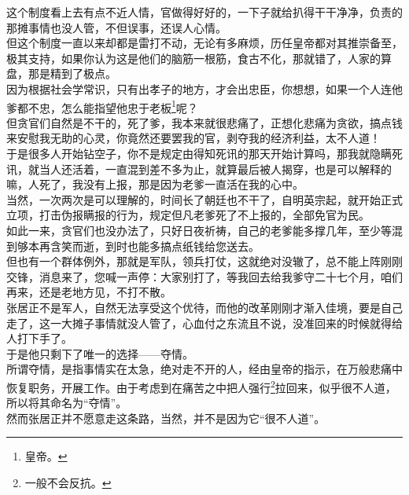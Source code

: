 \begin{multicols}{\theparacolNo}
这个制度看上去有点不近人情，官做得好好的，一下子就给扒得干干净净，负责的那摊事情也没人管，不但误事，还误人心情。\\

但这个制度一直以来却都是雷打不动，无论有多麻烦，历任皇帝都对其推崇备至，极其支持，如果你认为这是他们的脑筋一根筋，食古不化，那就错了，人家的算盘，那是精到了极点。\\

因为根据社会学常识，只有出孝子的地方，才会出忠臣，你想想，如果一个人连他爹都不忠，怎么能指望他忠于老板\footnote{皇帝。}呢？\\

但贪官们自然是不干的，死了爹，我本来就很悲痛了，正想化悲痛为贪欲，搞点钱来安慰我无助的心灵，你竟然还要罢我的官，剥夺我的经济利益，太不人道！\\

于是很多人开始钻空子，你不是规定由得知死讯的那天开始计算吗，那我就隐瞒死讯，就当人还活着，一直混到差不多为止，就算最后被人揭穿，也是可以解释的嘛，人死了，我没有上报，那是因为老爹一直活在我的心中。\\

当然，一次两次是可以理解的，时间长了朝廷也不干了，自明英宗起，就开始正式立项，打击伪报瞒报的行为，规定但凡老爹死了不上报的，全部免官为民。\\

如此一来，贪官们也没办法了，只好日夜祈祷，自己的老爹能多撑几年，至少等混到够本再含笑而逝，到时也能多搞点纸钱给您送去。\\

但也有一个群体例外，那就是军队，领兵打仗，这就绝对没辙了，总不能上阵刚刚交锋，消息来了，您喊一声停：大家别打了，等我回去给我爹守二十七个月，咱们再来，还是老地方见，不打不散。\\

张居正不是军人，自然无法享受这个优待，而他的改革刚刚才渐入佳境，要是自己走了，这一大摊子事情就没人管了，心血付之东流且不说，没准回来的时候就得给人打下手了。\\

于是他只剩下了唯一的选择——夺情。\\

所谓夺情，是指事情实在太急，绝对走不开的人，经由皇帝的指示，在万般悲痛中恢复职务，开展工作。由于考虑到在痛苦之中把人强行\footnote{一般不会反抗。}拉回来，似乎很不人道，所以将其命名为“夺情”。\\

然而张居正并不愿意走这条路，当然，并不是因为它“很不人道”。\\


\end{multicols}
